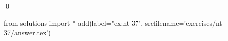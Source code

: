 
\begin{ex} 
  \label{ex:nt-37}
  
  \qed
\end{ex} 
\begin{python0}
from solutions import *
add(label="ex:nt-37",
    srcfilename='exercises/nt-37/answer.tex') 
\end{python0}
